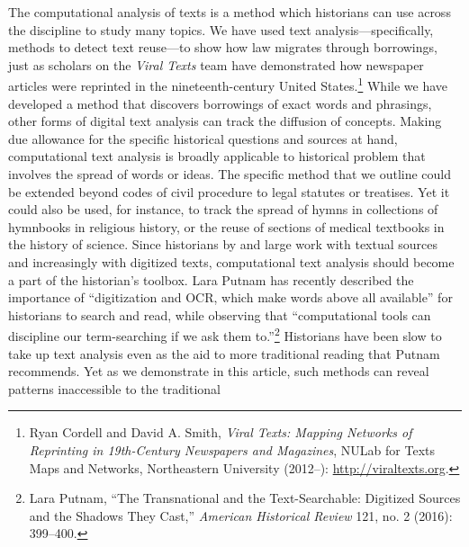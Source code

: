 \documentclass[12pt,]{article}
\let\rmarkdownfootnote\footnote%
\def\footnote{\protect\rmarkdownfootnote}
\begin{document}
The computational analysis of texts is a method which historians can use
across the discipline to study many topics. We have used text
analysis---specifically, methods to detect text reuse---to show how law
migrates through borrowings, just as scholars on the \emph{Viral Texts}
team have demonstrated how newspaper articles were reprinted in the
nineteenth-century United States.\footnote{Ryan Cordell and David A.
  Smith, \emph{Viral Texts: Mapping Networks of Reprinting in
  19th-Century Newspapers and Magazines}, NULab for Texts Maps and
  Networks, Northeastern University (2012--):
  \url{http://viraltexts.org}.} While we have developed a method that
discovers borrowings of exact words and phrasings, other forms of
digital text analysis can track the diffusion of concepts. Making due
allowance for the specific historical questions and sources at hand,
computational text analysis is broadly applicable to historical problem
that involves the spread of words or ideas. The specific method that we
outline could be extended beyond codes of civil procedure to legal
statutes or treatises. Yet it could also be used, for instance, to track
the spread of hymns in collections of hymnbooks in religious history, or
the reuse of sections of medical textbooks in the history of science.
Since historians by and large work with textual sources and increasingly
with digitized texts, computational text analysis should become a part
of the historian's toolbox. Lara Putnam has recently described the
importance of ``digitization and OCR, which make words above all
available'' for historians to search and read, while observing that
``computational tools can discipline our term-searching if we ask them
to.''\footnote{Lara Putnam, ``The Transnational and the Text-Searchable:
  Digitized Sources and the Shadows They Cast,'' \emph{American
  Historical Review} 121, no. 2 (2016): 399--400.} Historians have been
slow to take up text analysis even as the aid to more traditional
reading that Putnam recommends. Yet as we demonstrate in this article,
such methods can reveal patterns inaccessible to the traditional
\end{document}
